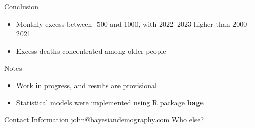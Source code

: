 \documentclass[final]{beamer}
\newlength{\onecolwid}
\begin{document}
\begin{frame}[t]
\begin{columns}[t]
\begin{column}{\onecolwid}
  
\begin{block}{Conclusion}
  \begin{itemize}
  \item Monthly excess between -500 and 1000, with 2022--2023 higher than 2000--2021
  \item Excess deaths concentrated among older people
  \end{itemize}
\end{block}

\begin{block}{Notes}
\begin{itemize}
\item Work in progress, and results are provisional
\item Statistical models were implemented using R package \textbf{bage}
\end{itemize}
\end{block}


\begin{alertblock}{Contact Information}
  john@bayesiandemography.com
  Who else?
\end{alertblock}


\end{column} %

\end{columns} %

\end{frame} %
\end{document}
